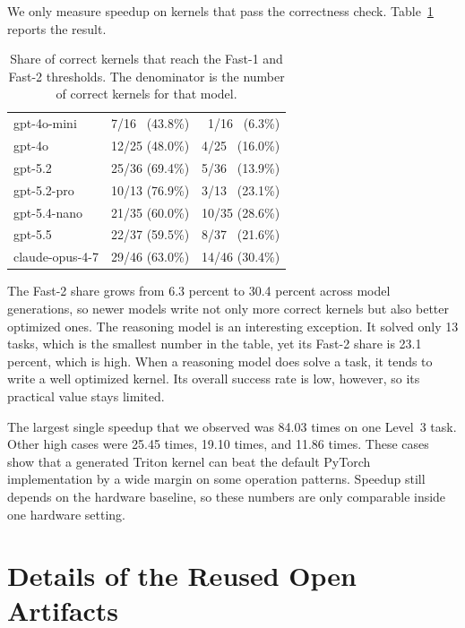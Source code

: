 We only measure speedup on kernels that pass the correctness check. Table~\ref{tab:fast} reports the
result.

\begin{table}[h]
\centering
\small
\setlength{\tabcolsep}{6pt}
\caption{Share of correct kernels that reach the Fast-1 and Fast-2 thresholds. The denominator is
the number of correct kernels for that model.}
\label{tab:fast}
\begin{tabular}{@{}lrr@{}}
\toprule
\headrow{Model} & \headrow{Fast-1} & \headrow{Fast-2} \\
\midrule
gpt-4o-mini     & 7/16 \ (43.8\%)  & 1/16 \ (6.3\%)  \\
gpt-4o          & 12/25 (48.0\%)   & 4/25 \ (16.0\%) \\
gpt-5.2         & 25/36 (69.4\%)   & 5/36 \ (13.9\%) \\
gpt-5.2-pro     & 10/13 (76.9\%)   & 3/13 \ (23.1\%) \\
gpt-5.4-nano    & 21/35 (60.0\%)   & 10/35 (28.6\%)  \\
gpt-5.5         & 22/37 (59.5\%)   & 8/37 \ (21.6\%) \\
claude-opus-4-7 & 29/46 (63.0\%)   & 14/46 (30.4\%)  \\
\bottomrule
\end{tabular}
\end{table}

The Fast-2 share grows from 6.3 percent to 30.4 percent across model generations, so newer models
write not only more correct kernels but also better optimized ones. The reasoning model is an
interesting exception. It solved only 13 tasks, which is the smallest number in the table, yet its
Fast-2 share is 23.1 percent, which is high. When a reasoning model does solve a task, it tends to
write a well optimized kernel. Its overall success rate is low, however, so its practical value
stays limited.

The largest single speedup that we observed was 84.03 times on one Level~3 task. Other high cases
were 25.45 times, 19.10 times, and 11.86 times. These cases show that a generated Triton kernel can
beat the default PyTorch implementation by a wide margin on some operation patterns. Speedup still
depends on the hardware baseline, so these numbers are only comparable inside one hardware setting.

\section{Details of the Reused Open Artifacts}

